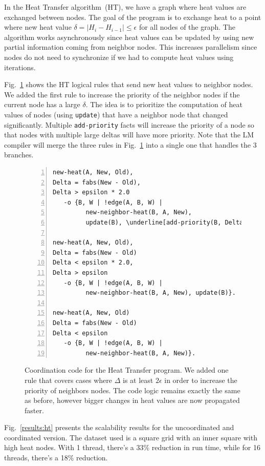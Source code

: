 In the Heat Transfer algorithm~(HT), we have a graph where heat values are
exchanged between nodes. The goal of the program is to exchange heat to a point
where new heat value $\delta = |H_i -
H_{i-1}| \le \epsilon$ for all nodes of the graph. The algorithm works
asynchronously since heat values can be updated by using new partial information
coming from neighbor nodes. This increases parallelism since nodes do not need
to synchronize if we had to compute heat values using iterations.

Fig.~\ref{code:ht} shows the HT logical rules that send new heat values to
neighbor nodes. We added the first rule to increase the priority of the neighbor
nodes if the current node has a large $\delta$. The idea is to prioritize the
computation of heat values of nodes (using \texttt{update}) that have a neighbor
node that changed significantly. Multiple \texttt{add-priority} facts will
increase the priority of a node so that nodes with multiple large deltas will
have more priority. Note that the LM compiler will merge the three rules in
Fig.~\ref{code:ht} into a single one that handles the 3 branches.

\begin{figure}[h!]
\scriptsize\begin{Verbatim}[numbers=left,commandchars=\\\[\]]
new-heat(A, New, Old),
Delta = fabs(New - Old),
Delta > epsilon * 2.0
   -o {B, W | !edge(A, B, W) |
         new-neighbor-heat(B, A, New),
         update(B), \underline[add-priority(B, Delta)]}.

new-heat(A, New, Old),
Delta = fabs(New - Old)
Delta < epsilon * 2.0,
Delta > epsilon
   -o {B, W | !edge(A, B, W) |
         new-neighbor-heat(B, A, New), update(B)}.

new-heat(A, New, Old)
Delta = fabs(New - Old)
Delta < epsilon
   -o {B, W | !edge(A, B, W) |
         new-neighbor-heat(B, A, New)}.
\end{Verbatim}
  \caption{Coordination code for the Heat Transfer program. We added one rule
     that covers cases where $\Delta$ is at least $2 \epsilon$ in order to
     increase the priority of neighbors nodes. The code logic remains exactly
     the same as before, however bigger changes in heat values are now
     propagated faster.}
  \label{code:ht}
\end{figure}
\normalsize

Fig.~\ref{results:ht} presents the scalability results for the uncoordinated
and coordinated version. The dataset used is a square grid with an inner square
with high heat nodes. With 1 thread, there's a 33\% reduction in run time, while
for 16 threads, there's a 18\% reduction.

